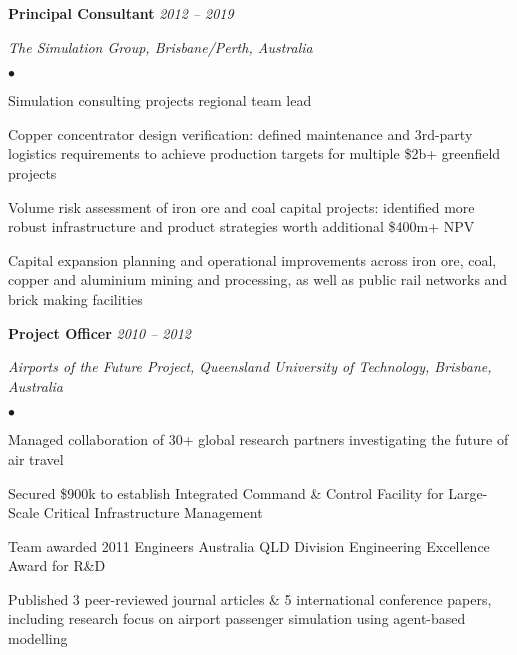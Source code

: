 \documentclass[margin,line]{resume}
\newenvironment{list1}{
  \begin{list}{}{%
      \setlength{\itemsep}{0in}
      \setlength{\parsep}{0in} \setlength{\parskip}{0in}
      \setlength{\topsep}{0in} \setlength{\partopsep}{0in}
      \setlength{\leftmargin}{0.17in}}}{\end{list}}
\newenvironment{list2}{
  \begin{list}{$\bullet$}{%
      \setlength{\itemsep}{0in}
      \setlength{\parsep}{0in} \setlength{\parskip}{0in}
      \setlength{\topsep}{0in} \setlength{\partopsep}{0in}
      \setlength{\leftmargin}{0.2in}}}{\end{list}}
\begin{document}
\begin{resume}
{\textbf{Principal Consultant}} \hfill {\it 2012 -- 2019}\\
\vspace{-0.85\baselineskip}
\begin{list1}
\item {\it The Simulation Group, Brisbane/Perth, Australia}
\begin{list2}
\item Simulation consulting projects regional team lead
\item Copper concentrator design verification: defined maintenance and 3rd-party logistics requirements to achieve production targets for multiple \$2b+ greenfield projects
\item Volume risk assessment of iron ore and coal capital projects: identified more robust infrastructure and product strategies worth additional \$400m+ NPV
\item Capital expansion planning and operational improvements across iron ore, coal, copper and aluminium mining and processing, as well as public rail networks and brick making facilities
\end{list2}
\end{list1}

{\textbf{Project Officer}} \hfill {\it 2010 -- 2012}\\
\vspace{-0.85\baselineskip}
\begin{list1}
\item {\it Airports of the Future Project, Queensland University of Technology, Brisbane, Australia}
\begin{list2}
\item Managed collaboration of 30+ global research partners investigating the future of air travel
\item Secured \$900k to establish Integrated Command \& Control Facility for Large-Scale Critical Infrastructure Management
\item Team awarded 2011 Engineers Australia QLD Division Engineering Excellence Award for R\&D
\item Published 3 peer-reviewed journal articles \& 5 international conference papers, including research focus on airport passenger simulation using agent-based modelling
\end{list2}
\end{list1}


\end{resume}
\end{document}
